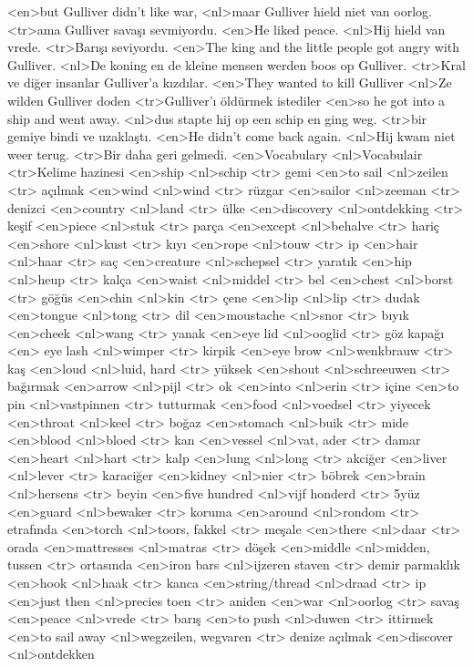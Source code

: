 <en>but Gulliver didn’t like war,
<nl>maar Gulliver hield niet van oorlog.
<tr>ama Gulliver savaşı sevmiyordu.
<en>He liked peace.
<nl>Hij hield van vrede.
<tr>Barışı seviyordu.
<en>The king and the little people got angry with Gulliver.
<nl>De koning en de kleine mensen werden boos op Gulliver.
<tr>Kral ve diğer insanlar Gulliver’a kızdılar.
<en>They wanted to kill Gulliver
<nl>Ze wilden Gulliver doden
<tr>Gulliver’ı öldürmek istediler
<en>so he got into a ship and went away.
<nl>dus stapte hij op een schip  en ging weg.
<tr>bir gemiye bindi ve uzaklaştı.
<en>He didn’t come back again.
<nl>Hij kwam niet weer terug.
<tr>Bir daha geri gelmedi.
<en>Vocabulary
<nl>Vocabulair
<tr>Kelime hazinesi
<en>ship 
<nl>schip 
<tr> gemi
<en>to sail 
<nl>zeilen 
<tr> açılmak
<en>wind 
<nl>wind 
<tr> rüzgar
<en>sailor 
<nl>zeeman 
<tr> denizci
<en>country 
<nl>land 
<tr> ülke
<en>discovery 
<nl>ontdekking
<tr> keşif
<en>piece 
<nl>stuk
<tr> parça
<en>except 
<nl>behalve
<tr> hariç
<en>shore 
<nl>kust
<tr> kıyı
<en>rope 
<nl>touw
<tr> ip
<en>hair 
<nl>haar
<tr> saç
<en>creature 
<nl>schepsel
<tr> yaratık
<en>hip 
<nl>heup
<tr> kalça
<en>waist 
<nl>middel
<tr> bel
<en>chest 
<nl>borst
<tr> göğüs
<en>chin 
<nl>kin
<tr> çene
<en>lip 
<nl>lip
<tr> dudak
<en>tongue 
<nl>tong
<tr> dil
<en>moustache 
<nl>snor
<tr> bıyık
<en>cheek 
<nl>wang
<tr> yanak
<en>eye lid 
<nl>ooglid
<tr> göz kapağı
<en> eye lash 
<nl>wimper
<tr> kirpik
<en>eye brow 
<nl>wenkbrauw
<tr> kaş
<en>loud 
<nl>luid, hard
<tr> yüksek
<en>shout 
<nl>schreeuwen
<tr> bağırmak
<en>arrow 
<nl>pijl
<tr> ok
<en>into 
<nl>erin
<tr> içine
<en>to pin 
<nl>vastpinnen
<tr> tutturmak
<en>food 
<nl>voedsel
<tr> yiyecek
<en>throat 
<nl>keel
<tr> boğaz
<en>stomach 
<nl>buik
<tr> mide
<en>blood 
<nl>bloed
<tr> kan
<en>vessel 
<nl>vat, ader
<tr> damar
<en>heart 
<nl>hart
<tr> kalp
<en>lung 
<nl>long
<tr> akciğer
<en>liver 
<nl>lever
<tr> karaciğer
<en>kidney 
<nl>nier
<tr> böbrek
<en>brain 
<nl>hersens
<tr> beyin
<en>five hundred 
<nl>vijf honderd
<tr> 5yüz
<en>guard 
<nl>bewaker
<tr> koruma
<en>around 
<nl>rondom
<tr> etrafında
<en>torch 
<nl>toors, fakkel
<tr> meşale
<en>there 
<nl>daar
<tr> orada
<en>mattresses 
<nl>matras
<tr> döşek
<en>middle 
<nl>midden, tussen
<tr> ortasında
<en>iron bars 
<nl>ijzeren staven
<tr> demir parmaklık
<en>hook 
<nl>haak
<tr> kanca
<en>string/thread 
<nl>draad
<tr> ip
<en>just then 
<nl>precies toen
<tr> aniden
<en>war 
<nl>oorlog
<tr> savaş
<en>peace 
<nl>vrede
<tr> barış
<en>to push 
<nl>duwen
<tr> ittirmek
<en>to sail away 
<nl>wegzeilen, wegvaren
<tr> denize açılmak
<en>discover 
<nl>ontdekken
